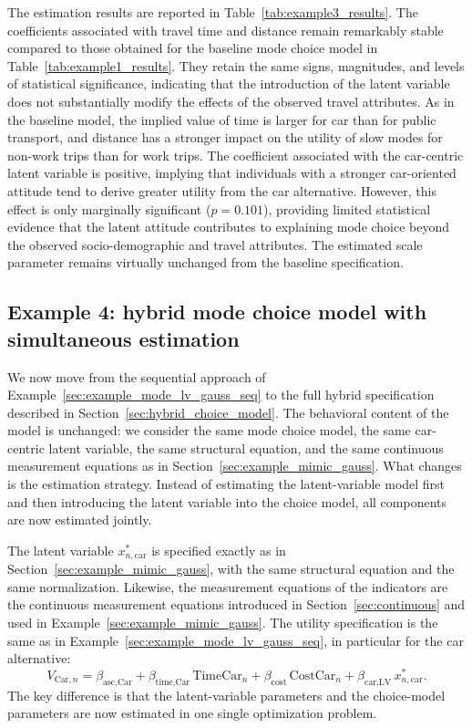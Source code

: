 \documentclass[12pt,a4paper]{article}
\newcommand{\TimeCar}{\mathrm{TimeCar}}
\newcommand{\CostCar}{\mathrm{CostCar}}
\begin{document}
The estimation results are reported in
Table~\ref{tab:example3_results}. The coefficients associated with
travel time and distance remain remarkably stable compared to those
obtained for the baseline mode choice model in
Table~\ref{tab:example1_results}. They retain the same signs,
magnitudes, and levels of statistical significance, indicating that
the introduction of the latent variable does not substantially modify
the effects of the observed travel attributes. As in the baseline
model, the implied value of time is larger for car than for public
transport, and distance has a stronger impact on the utility of slow
modes for non-work trips than for work trips. The coefficient
associated with the car-centric latent variable is positive, implying
that individuals with a stronger car-oriented attitude tend to derive
greater utility from the car alternative. However, this effect is only
marginally significant (\(p=0.101\)), providing limited statistical
evidence that the latent attitude contributes to explaining mode
choice beyond the observed socio-demographic and travel attributes.
The estimated scale parameter remains virtually unchanged from the
baseline specification.

\FloatBarrier

\subsection{Example 4: hybrid mode choice model with simultaneous estimation}
\label{sec:example_mode_lv_gauss_sim}

We now move from the sequential approach of
Example~\ref{sec:example_mode_lv_gauss_seq} to the full hybrid
specification described in Section~\ref{sec:hybrid_choice_model}. The
behavioral content of the model is unchanged: we consider the same
mode choice model, the same car-centric latent variable, the same
structural equation, and the same continuous measurement equations as
in Section~\ref{sec:example_mimic_gauss}. What changes is the
estimation strategy. Instead of estimating the latent-variable model
first and then introducing the latent variable into the choice model,
all components are now estimated jointly.

The latent variable \(x^*_{n,\mathrm{car}}\) is specified exactly as
in Section~\ref{sec:example_mimic_gauss}, with the same structural
equation and the same normalization. Likewise, the measurement
equations of the indicators are the continuous measurement equations
introduced in Section~\ref{sec:continuous} and used in
Example~\ref{sec:example_mimic_gauss}. The utility specification is
the same as in Example~\ref{sec:example_mode_lv_gauss_seq}, in
particular for the car alternative:
\begin{equation}
  \label{eq:example4_v_car}
  V_{\text{Car},n} = \beta_{\text{asc,Car}} + \beta_{\text{time,Car}}
  \, \TimeCar_n + \beta_{\text{cost}} \, \CostCar_n +
  \beta_{\text{car,LV}} \, x^*_{n,\mathrm{car}}.
\end{equation}
The key difference is that the latent-variable parameters and the
choice-model parameters are now estimated in one single optimization
problem.
\end{document}
